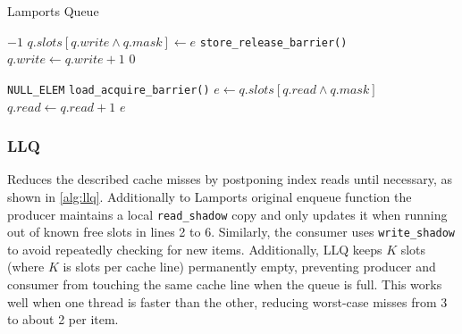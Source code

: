 \begin{algorithm}[!ht]
   \centering
   \captionsetup{justification=centering}
   \caption{Lamports Queue \cite{MaffioneCacheAware}}
   \label{alg:lamport-queue}
   \scriptsize
   \begin{algorithmic}[1]
            
               \State \Return $-1$ 
           \EndIf
           \State $q.slots[q.write \land q.mask] \gets e$
           \State \texttt{store\_release\_barrier()}
           \State $q.write \gets q.write + 1$
           \State \Return $0$
       \EndFunction
       
       \State
       
            
               \State \Return \texttt{NULL\_ELEM} 
           \EndIf
           \State \texttt{load\_acquire\_barrier()}
           \State $e \gets q.slots[q.read \land q.mask]$
           \State $q.read \gets q.read + 1$
           \State \Return $e$
       \EndFunction
   \end{algorithmic}
   \cite{MaffioneCacheAware}
\end{algorithm}

\subsubsection{\acf{LLQ}}
Reduces the described cache misses by postponing index reads until necessary, as shown in \cref{alg:llq}. Additionally to Lamports original enqueue function the producer maintains a local \texttt{read\_shadow} copy and only updates it when running out of known free slots in lines 2 to 6. Similarly, the consumer uses \texttt{write\_shadow} to avoid repeatedly checking for new items. Additionally, \ac{LLQ} keeps $K$ slots (where $K$ is slots per cache line) permanently empty, preventing producer and consumer from touching the same cache line when the queue is full. This works well when one thread is faster than the other, reducing worst-case misses from 3 to about 2 per item. \cite{MaffioneCacheAware}

